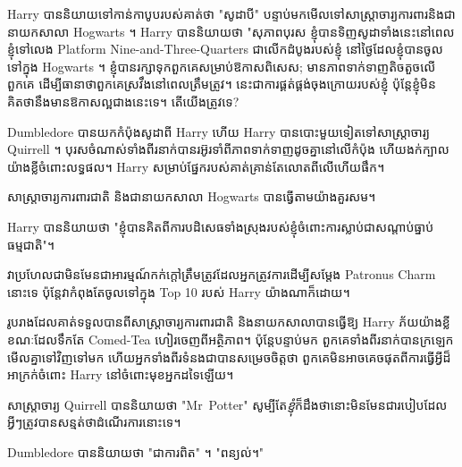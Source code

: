 Harry បាននិយាយទៅកាន់កាបូបរបស់គាត់ថា "សូដាបី" បន្ទាប់មកមើលទៅសាស្រ្តាចារ្យការពារនិងជានាយកសាលា Hogwarts ។ Harry បាននិយាយថា "សុភាពបុរស ខ្ញុំបានទិញសូដាទាំងនេះនៅពេលខ្ញុំទៅលេង Platform Nine-and-Three-Quarters ជាលើកដំបូងរបស់ខ្ញុំ នៅថ្ងៃដែលខ្ញុំបានចូលទៅក្នុង Hogwarts ។ ខ្ញុំបានរក្សាទុកពួកគេសម្រាប់ឱកាសពិសេស; មានភាពទាក់ទាញតិចតួចលើពួកគេ ដើម្បីធានាថាពួកគេស្រវឹងនៅពេលត្រឹមត្រូវ។ នេះជាការផ្គត់ផ្គង់ចុងក្រោយរបស់ខ្ញុំ ប៉ុន្តែខ្ញុំមិនគិតថានឹងមានឱកាសល្អជាងនេះទេ។ តើយើងត្រូវទេ?

Dumbledore បានយកកំប៉ុងសូដាពី Harry ហើយ Harry បានបោះមួយទៀតទៅសាស្រ្តាចារ្យ Quirrell ។ បុរសចំណាស់ទាំងពីរនាក់បានរអ៊ូរទាំពីភាពទាក់ទាញដូចគ្នានៅលើកំប៉ុង ហើយងក់ក្បាលយ៉ាងខ្លីចំពោះលទ្ធផល។ Harry សម្រាប់ផ្នែករបស់គាត់គ្រាន់តែលោតពីលើហើយផឹក។

សាស្ត្រាចារ្យការពារជាតិ និងជានាយកសាលា Hogwarts បានធ្វើតាមយ៉ាងគួរសម។

Harry បាននិយាយថា "ខ្ញុំបានគិតពីការបដិសេធទាំងស្រុងរបស់ខ្ញុំចំពោះការស្លាប់ជាសណ្តាប់ធ្នាប់ធម្មជាតិ"។

វាប្រហែលជាមិនមែនជាអារម្មណ៍កក់ក្តៅត្រឹមត្រូវដែលអ្នកត្រូវការដើម្បីសម្ដែង Patronus Charm នោះទេ ប៉ុន្តែវាកំពុងតែចូលទៅក្នុង Top 10 របស់ Harry យ៉ាងណាក៏ដោយ។

រូបរាងដែលគាត់ទទួលបានពីសាស្ត្រាចារ្យការពារជាតិ និងនាយកសាលាបានធ្វើឱ្យ Harry ភ័យយ៉ាងខ្លី ខណៈដែលទឹកតែ Comed-Tea ហៀរចេញពីអត្ថិភាព។ ប៉ុន្តែបន្ទាប់មក ពួកគេទាំងពីរនាក់បានក្រឡេកមើលគ្នាទៅវិញទៅមក ហើយអ្នកទាំងពីរទំនងជាបានសម្រេចចិត្តថា ពួកគេមិនអាចគេចផុតពីការធ្វើអ្វីដ៏អាក្រក់ចំពោះ Harry នៅចំពោះមុខអ្នកដទៃឡើយ។

សាស្រ្តាចារ្យ Quirrell បាននិយាយថា "Mr~Potter" សូម្បីតែ\emph{ខ្ញុំ}ក៏ដឹងថានោះមិនមែនជារបៀបដែលអ្វីៗត្រូវបានសន្មត់ថាដំណើរការនោះទេ។

Dumbledore បាននិយាយថា "ជាការពិត" ។ "ពន្យល់។"

